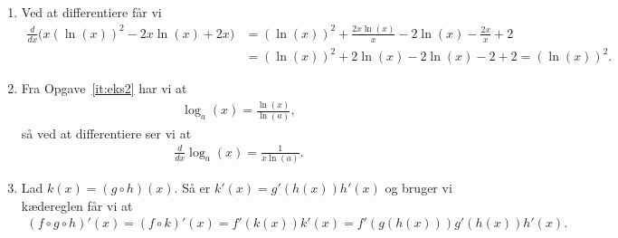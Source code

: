 \begin{enumerate}
	
	\item\label{it:diff32} Ved at differentiere får vi
	\begin{align*}
	\frac{d}{dx}\Big( x(\ln(x))^2 -2x\ln(x)+2x\Big)	&=(\ln(x))^2+\frac{2x\ln(x)}{x}-2\ln(x)-\frac{2x}{x}+2\\
	&=(\ln(x))^2+2\ln(x)-2\ln(x)-2+2=(\ln(x))^2.
	\end{align*}
	
	
	
	\item Fra Opgave~\ref{it:eks2} har vi at
	\begin{align*}
	\log_a(x)=\frac{\ln(x)}{\ln(a)},
	\end{align*}
	så ved at differentiere ser vi at
	\begin{align*}
	\frac{d}{dx} \log_a(x)=\frac{1}{x\ln(a)}.
	\end{align*}
	
	\item Lad $k(x)=(g\circ h)(x)$. Så er $k'(x)=g'(h(x))h'(x)$ og bruger vi kædereglen får vi at
	\begin{align*}
	(f\circ g \circ h)'(x)=(f\circ k)'(x)=f'(k(x))k'(x)=f'(g(h(x)))g'(h(x))h'(x).
	\end{align*}
\end{enumerate}